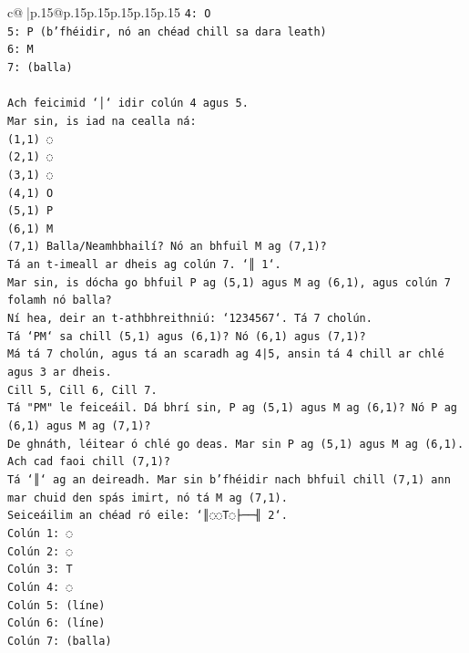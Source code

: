 \documentclass{article}
\begin{document}
{\begin{supertabular}{c@{$\;$}|p{.15\linewidth}@{}p{.15\linewidth}p{.15\linewidth}p{.15\linewidth}p{.15\linewidth}p{.15\linewidth}}
{{{\texttt{4: O} \\
\texttt{5: P (b'fhéidir, nó an chéad chill sa dara leath)} \\
\texttt{6: M} \\
\texttt{7: (balla)} \\
\\ 
\texttt{Ach feicimid `│` idir colún 4 agus 5.} \\
\texttt{Mar sin, is iad na cealla ná:} \\
\texttt{(1,1) ◌} \\
\texttt{(2,1) ◌} \\
\texttt{(3,1) ◌} \\
\texttt{(4,1) O} \\
\texttt{(5,1) P} \\
\texttt{(6,1) M} \\
\texttt{(7,1) Balla/Neamhbhailí? Nó an bhfuil M ag (7,1)?} \\
\texttt{Tá an t{-}imeall ar dheis ag colún 7. `║ 1`.} \\
\texttt{Mar sin, is dócha go bhfuil P ag (5,1) agus M ag (6,1), agus colún 7 folamh nó balla?} \\
\texttt{Ní hea, deir an t{-}athbhreithniú: `1234567`. Tá 7 cholún.} \\
\texttt{Tá `PM` sa chill (5,1) agus (6,1)? Nó (6,1) agus (7,1)?} \\
\texttt{Má tá 7 cholún, agus tá an scaradh ag 4|5, ansin tá 4 chill ar chlé agus 3 ar dheis.} \\
\texttt{Cill 5, Cill 6, Cill 7.} \\
\texttt{Tá "PM" le feiceáil. Dá bhrí sin, P ag (5,1) agus M ag (6,1)? Nó P ag (6,1) agus M ag (7,1)?} \\
\texttt{De ghnáth, léitear ó chlé go deas. Mar sin P ag (5,1) agus M ag (6,1). Ach cad faoi chill (7,1)?} \\
\texttt{Tá `║` ag an deireadh. Mar sin b'fhéidir nach bhfuil chill (7,1) ann mar chuid den spás imirt, nó tá M ag (7,1).} \\
\texttt{Seiceáilim an chéad ró eile: `║◌◌T◌├──╢ 2`.} \\
\texttt{Colún 1: ◌} \\
\texttt{Colún 2: ◌} \\
\texttt{Colún 3: T} \\
\texttt{Colún 4: ◌} \\
\texttt{Colún 5: (líne)} \\
\texttt{Colún 6: (líne)} \\
\texttt{Colún 7: (balla)} \\
}}}
\end{supertabular}}
\end{document}
